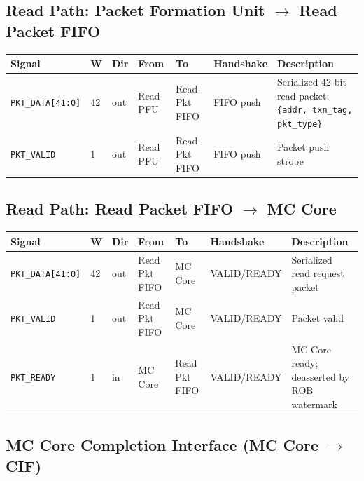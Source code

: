\documentclass[11pt,a4paper]{article}
\begin{document}
\subsection{Read Path: Packet Formation Unit $\rightarrow$ Read Packet FIFO}

\begin{tabularx}{\textwidth}{L{3.0cm} C{0.8cm} C{1.0cm} L{2.2cm} L{2.2cm} L{2.0cm} X}
\toprule
\textbf{Signal} & \textbf{W} & \textbf{Dir} & \textbf{From} & \textbf{To} & \textbf{Handshake} & \textbf{Description} \\
\midrule
\texttt{PKT\_DATA[41:0]} & 42 & out & Read PFU & Read Pkt FIFO & FIFO push & Serialized 42-bit read packet: \texttt{\{addr, txn\_tag, pkt\_type\}} \\
\texttt{PKT\_VALID}      & 1  & out & Read PFU & Read Pkt FIFO & FIFO push & Packet push strobe \\
\bottomrule
\end{tabularx}

\subsection{Read Path: Read Packet FIFO $\rightarrow$ MC Core}

\begin{tabularx}{\textwidth}{L{3.0cm} C{0.8cm} C{1.0cm} L{2.2cm} L{2.2cm} L{2.0cm} X}
\toprule
\textbf{Signal} & \textbf{W} & \textbf{Dir} & \textbf{From} & \textbf{To} & \textbf{Handshake} & \textbf{Description} \\
\midrule
\texttt{PKT\_DATA[41:0]} & 42 & out & Read Pkt FIFO & MC Core & VALID/READY & Serialized read request packet \\
\texttt{PKT\_VALID}      & 1  & out & Read Pkt FIFO & MC Core & VALID/READY & Packet valid \\
\texttt{PKT\_READY}      & 1  & in  & MC Core       & Read Pkt FIFO & VALID/READY & MC Core ready; deasserted by ROB watermark \\
\bottomrule
\end{tabularx}

\subsection{MC Core Completion Interface (MC Core $\rightarrow$ CIF)}
\end{document}
